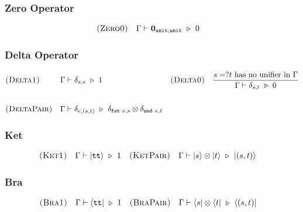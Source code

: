 \subsubsection*{Zero Operator}
\begin{align*}
  & \textsc{(Zero0)} && \Gamma \vdash \mathbf{0}_{\texttt{unit}, \texttt{unit}} \ \triangleright\ 0
\end{align*}


\subsubsection*{Delta Operator}
\begin{align*}
  & \textsc{(Delta1)} && \Gamma \vdash \delta_{s, s}\ \triangleright\  1
  && \textsc{(Delta0)} && \frac{s =? t\ \textrm{has no unifier in}\ \Gamma}{\Gamma \vdash \delta_{s, t} \ \triangleright\ 0} \\
  \\
  & \textsc{(DeltaPair)} && \Gamma \vdash \delta_{e, (s, t)} \ \triangleright\  \delta_{\texttt{fst}\ e, s} \otimes \delta_{\texttt{snd}\ e, t}
\end{align*}

\subsubsection*{Ket}
\begin{align*}
  & \textsc{(Ket1)} && \Gamma \vdash |\texttt{tt}\rangle \ \triangleright\  1
  && \textsc{(KetPair)} && \Gamma \vdash |s\rangle \otimes |t\rangle\ \triangleright\ |(s, t)\rangle 
\end{align*}

\subsubsection*{Bra}
\begin{align*}
  & \textsc{(Bra1)} && \Gamma \vdash \langle \texttt{tt}| \ \triangleright\  1
  && \textsc{(BraPair)} && \Gamma \vdash \langle s| \otimes \langle t|\ \triangleright\ \langle (s, t)| 
\end{align*}


